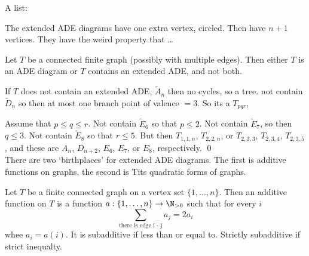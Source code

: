 A list:








The extended ADE diagrams have one extra vertex, circled. Then have $n+1$ vertices. They have the weird property that \dots

\begin{prop} \label{prop:a}
Let $T$ be a connected finite graph (possibly with multiple edges). Then either $T$ is an ADE diagram or $T$ contains an extended ADE, and not both. 
\end{prop}

\pf If $T$ does not contain an extended ADE, $\tilde{A}_n$ then no cycles, so a tree. not contain $\tilde{D}_n$ so then at most one branch point of valence $=3$. So its a $T_{pqr}$, 


Assume that $p \leq q \leq r$. Not contain $\tilde{E}_6$ so that $p \leq 2$. Not contain $\tilde{E}_7$, so then $q \leq 3$. Not contain $\tilde{E}_8$ so that $r \leq 5$. But then $T_{1,1,n}$, $T_{2,2,n}$, or $T_{2,3,3}$, $T_{2,3,4}$, $T_{2,3,5}$, and these are $A_n$, $D_{n+2}$, $E_6$, $E_7$, or $E_8$, respectively. \qed \\


There are two `birthplaces' for extended ADE diagrams. The first is additive functions on graphs, the second is Tits quadratic forms of graphs. 


\begin{dfn}
Let $T$ be a finite connected graph on a vertex set $\{1,\ldots,n\}$. Then an additive function on $T$ is a function $a: \{1,\ldots,n\} \to \N_{>0}$ such that for every $i$
	\[
	\sum_{\text{there is edge i - j}} a_j = 2a_i
	\]
whee $a_i = a(i)$. It is subadditive if less than or equal to. Strictly subadditive if strict inequalty. 
\end{dfn}



